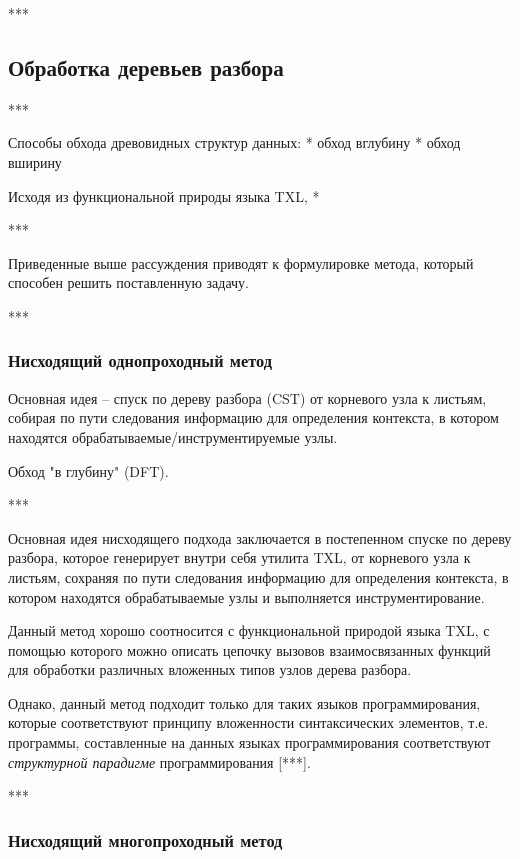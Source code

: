 ***

\subsection{Обработка деревьев разбора}

***

Способы обхода древовидных структур данных:
* обход вглубину
* обход вширину

Исходя из функциональной природы языка TXL, *

***

Приведенные выше рассуждения приводят к формулировке метода, который способен решить поставленную задачу.

***

\subsubsection{Нисходящий однопроходный метод}

Основная идея -- спуск по дереву разбора (CST) от корневого узла к листьям, собирая по пути следования информацию для определения контекста, в котором находятся обрабатываемые/инструментируемые узлы.

Обход "в глубину" (DFT).

***

Основная идея нисходящего подхода заключается в постепенном спуске по дереву разбора, которое генерирует внутри себя утилита TXL, от корневого узла к листьям, сохраняя по пути следования информацию для определения контекста, в котором находятся обрабатываемые узлы и выполняется инструментирование.

Данный метод хорошо соотносится с функциональной природой языка TXL, с помощью которого можно описать цепочку вызовов взаимосвязанных функций для обработки различных вложенных типов узлов дерева разбора.

Однако, данный метод подходит только для таких языков программирования, которые соответствуют принципу вложенности синтаксических элементов, т.е. программы, составленные на данных языках программирования соответствуют \textit{структурной парадигме} программирования [***].

***

\subsubsection{Нисходящий многопроходный метод}

